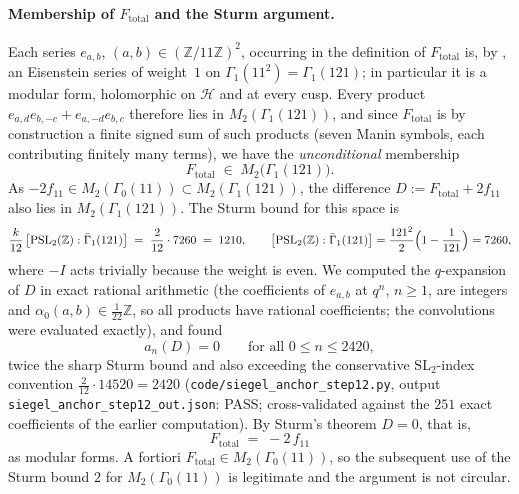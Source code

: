 
\paragraph{Membership of $F_{\mathrm{total}}$ and the Sturm argument.}
Each series $e_{a,b}$, $(a,b)\in(\mathbb{Z}/11\mathbb{Z})^2$, occurring in the
definition of $F_{\mathrm{total}}$ is, by \cite[Definition~10 and
Lemma~11]{Brunault}, an Eisenstein series of weight~$1$ on
$\Gamma_1(11^2)=\Gamma_1(121)$; in particular it is a modular form, holomorphic
on $\mathcal{H}$ and at every cusp.  Every product
$e_{a,d}e_{b,-c}+e_{a,-d}e_{b,c}$ therefore lies in $M_2(\Gamma_1(121))$, and
since $F_{\mathrm{total}}$ is by construction a finite signed sum of such
products (seven Manin symbols, each contributing finitely many terms), we have
the \emph{unconditional} membership
\[
  F_{\mathrm{total}} \;\in\; M_2\bigl(\Gamma_1(121)\bigr).
\]
As $-2f_{11}\in M_2(\Gamma_0(11))\subset M_2(\Gamma_1(121))$, the difference
$D:=F_{\mathrm{total}}+2f_{11}$ also lies in $M_2(\Gamma_1(121))$.  The Sturm
bound for this space is
\[
  \frac{k}{12}\,\bigl[\mathrm{PSL}_2(\mathbb{Z}):\bar\Gamma_1(121)\bigr]
  \;=\; \frac{2}{12}\cdot 7260 \;=\; 1210,
  \qquad
  \bigl[\mathrm{PSL}_2(\mathbb{Z}):\bar\Gamma_1(121)\bigr]
  = \frac{121^2}{2}\Bigl(1-\frac{1}{121}\Bigr) = 7260,
\]
where $-I$ acts trivially because the weight is even.  We computed the
$q$-expansion of $D$ in exact rational arithmetic (the coefficients of
$e_{a,b}$ at $q^n$, $n\ge1$, are integers and $\alpha_0(a,b)\in\frac1{22}\mathbb{Z}$,
so all products have rational coefficients; the convolutions were evaluated
exactly), and found
\[
  a_n(D)=0 \qquad\text{for all } 0\le n\le 2420,
\]
twice the sharp Sturm bound and also exceeding the conservative
$\mathrm{SL}_2$-index convention $\frac{2}{12}\cdot 14520 = 2420$
(\texttt{code/siegel\_anchor\_step12.py}, output
\texttt{siegel\_anchor\_step12\_out.json}: PASS; cross-validated against the
$251$ exact coefficients of the earlier computation).  By Sturm's theorem
$D=0$, that is,
\[
  F_{\mathrm{total}} \;=\; -2\,f_{11}
\]
as modular forms.  A fortiori $F_{\mathrm{total}}\in M_2(\Gamma_0(11))$, so the
subsequent use of the Sturm bound $2$ for $M_2(\Gamma_0(11))$ is legitimate and
the argument is not circular.

